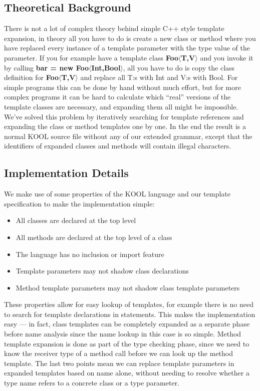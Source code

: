 \subsection{Theoretical Background}

There is not a lot of complex theory behind simple C++ style template expansion, in theory all you
have to do is create a new class or method where you have replaced every instance of a template
parameter with the type value of the parameter.  If you for example have a template class
\textbf{Foo$\langle$T,V$\rangle$} and you invoke it by calling \textbf{bar = new
Foo$\langle$Int,Bool$\rangle$}, all you have to do is copy the class definition for
\textbf{Foo$\langle$T,V$\rangle$} and replace all T:s with Int and V:s with Bool. For simple
programs this can be done by hand without much effort, but for more complex programs it can be hard
to calculate which ``real'' versions of the template classes are necessary, and expanding them all
might be impossible. We've solved this problem by iteratively searching for template references and
expanding the class or method templates one by one. In the end the result is a normal KOOL source
file without any of our extended grammar, except that the identifiers of expanded classes and
methods will contain illegal characters.

\subsection{Implementation Details}

We make use of some properties of the KOOL language and our template specification to make the
implementation simple:

\begin{itemize}
    \item All classes are declared at the top level
    \item All methods are declared at the top level of a class
    \item The language has no inclusion or import feature
    \item Template parameters may not shadow class declarations
    \item Method template parameters may not shadow class template parameters
\end{itemize}

These properties allow for easy lookup of templates, for example there is no need to search
for template declarations in statements. This makes the implementation easy --- in fact, class
templates can be completely expanded as a separate phase before name analysis since the name lookup
in this case is so simple. Method template expansion is done as part of the type checking phase,
since we need to know the receiver type of a method call before we can look up the method template.
The last two points mean we can replace template parameters in expanded templates based on name
alone, without needing to resolve whether a type name refers to a concrete class or a type
parameter.

